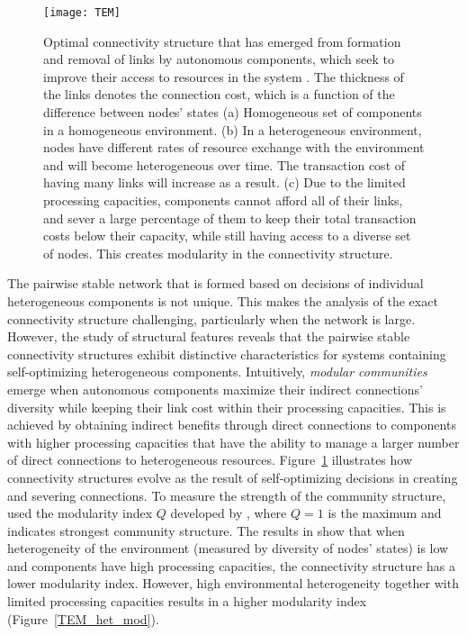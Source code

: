 \documentclass[journal,onecolumn]{IEEEtran}
\theoremstyle{plain}
\begin{document}
\begin{figure}[!t]
\centering
\texttt{[image: TEM]}
\caption{Optimal connectivity structure that has emerged from formation and removal of links by autonomous components, which seek to improve their access to resources in the system \citep{heydari2015emergence}. The thickness of the links denotes the connection cost, which is a function of the difference between nodes' states (a) Homogeneous set of components in a homogeneous environment. (b) In a heterogeneous environment, nodes have different rates of resource exchange with the environment and will become heterogeneous over time. The transaction cost of having many links will increase as a result. (c) Due to the limited processing capacities, components cannot afford all of their links, and sever a large percentage of them to keep their total transaction costs below their capacity, while still having access to a diverse set of nodes. This creates modularity in the connectivity structure.}
\label{tem}
\end{figure}

The pairwise stable network that is formed based on decisions of individual heterogeneous components is not unique. This makes the analysis of the exact connectivity structure challenging, particularly when the network is large. However, the study of structural features reveals that the pairwise stable connectivity structures exhibit distinctive characteristics for systems containing self-optimizing heterogeneous components.
Intuitively, \textit{modular communities} \citep{newman2006modularity} emerge when autonomous components maximize their indirect connections' diversity while keeping their link cost within their processing capacities. This is achieved by obtaining indirect benefits through direct connections to components with higher processing capacities that have the ability to manage a larger number of direct connections to heterogeneous resources. Figure~\ref{tem} illustrates how connectivity structures evolve as the result of self-optimizing decisions in creating and severing connections. To measure the strength of the community structure, \cite{heydari2015emergence} used the modularity index $Q$ developed by \cite{newman2004finding}, where $Q=1$ is the maximum and indicates strongest community structure. The results in \citep{heydari2015emergence} show that when heterogeneity of the environment (measured by diversity of nodes' states) is low and components have high processing capacities, the connectivity structure has a lower modularity index. However, high environmental heterogeneity together with limited processing capacities results in a higher modularity index (Figure~\ref{TEM_het_mod}).
\end{document}
